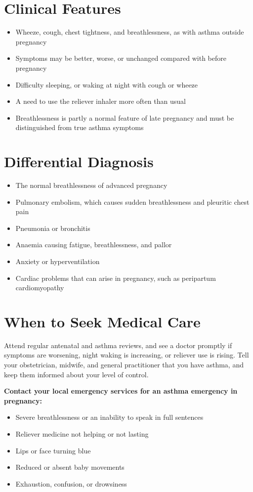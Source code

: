 \section*{Clinical Features}
\begin{itemize}
    \item Wheeze, cough, chest tightness, and breathlessness, as with asthma outside pregnancy
    \item Symptoms may be better, worse, or unchanged compared with before pregnancy
    \item Difficulty sleeping, or waking at night with cough or wheeze
    \item A need to use the reliever inhaler more often than usual
    \item Breathlessness is partly a normal feature of late pregnancy and must be distinguished from true asthma symptoms
\end{itemize}

\section*{Differential Diagnosis}
\begin{itemize}
    \item The normal breathlessness of advanced pregnancy
    \item Pulmonary embolism, which causes sudden breathlessness and pleuritic chest pain
    \item Pneumonia or bronchitis
    \item Anaemia causing fatigue, breathlessness, and pallor
    \item Anxiety or hyperventilation
    \item Cardiac problems that can arise in pregnancy, such as peripartum cardiomyopathy
\end{itemize}

\section*{When to Seek Medical Care}
Attend regular antenatal and asthma reviews, and see a doctor promptly if symptoms are worsening, night waking is increasing, or reliever use is rising. Tell your obstetrician, midwife, and general practitioner that you have asthma, and keep them informed about your level of control.

\textbf{Contact your local emergency services for an asthma emergency in pregnancy:}
\begin{itemize}
    \item Severe breathlessness or an inability to speak in full sentences
    \item Reliever medicine not helping or not lasting
    \item Lips or face turning blue
    \item Reduced or absent baby movements
    \item Exhaustion, confusion, or drowsiness
\end{itemize}

